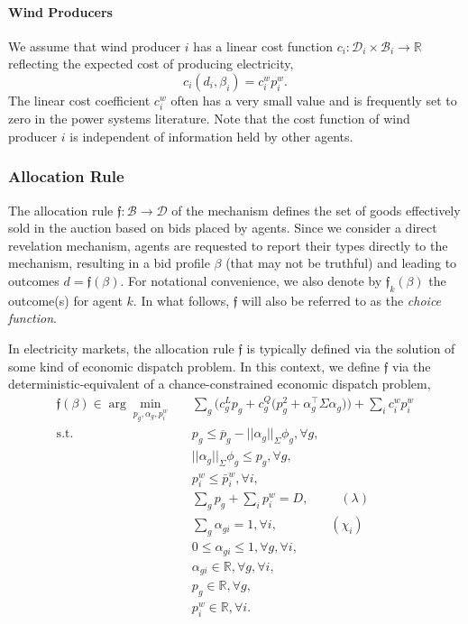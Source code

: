 \documentclass{article}
\begin{document}
\paragraph{Wind Producers} We assume that wind producer $i$ has a linear cost function $c_i: \mathcal{D}_i \times \mathcal{B}_i \rightarrow \mathbb{R}$ reflecting the expected cost of producing electricity,
\begin{equation*}
c_i(d_i, \beta_i) = c_i^w p_i^w.
\end{equation*}
The linear cost coefficient $c_i^w$ often has a very small value and is frequently set to zero in the power systems literature. Note that the cost function of wind producer $i$ is independent of information held by other agents.

\subsubsection{Allocation Rule}

The allocation rule $\mathfrak{f}: \mathcal{B} \rightarrow \mathcal{D}$ of the mechanism defines the set of goods effectively sold in the auction based on bids placed by agents. Since we consider a direct revelation mechanism, agents are requested to report their types directly to the mechanism, resulting in a bid profile $\beta$ (that may not be truthful) and leading to outcomes $d = \mathfrak{f}(\beta)$. For notational convenience, we also denote by $\mathfrak{f}_k(\beta)$ the outcome(s) for agent $k$. In what follows, $\mathfrak{f}$ will also be referred to as the \textit{choice function}.

In electricity markets, the allocation rule $\mathfrak{f}$ is typically defined via the solution of some kind of economic dispatch problem. In this context, we define $\mathfrak{f}$ via the deterministic-equivalent of a chance-constrained economic dispatch problem,
\begin{align}
\mathfrak{f}(\beta) \in \arg \underset{p_g, \alpha_g,p_i^w}{\min} \hspace{10pt} & \sum_g \Big(c_g^L p_g + c_g^Q \big(p_g^2 + \alpha_g^\top \Sigma \alpha_g\big)\Big) + \sum_i c_i^w p_i^w \\
\mbox{s.t. } & p_g \le \overline{p}_g - ||\alpha_g||_{\Sigma} \phi_g,\forall g,\\
& ||\alpha_g||_{\Sigma} \phi_g \le p_g,\forall g,\\
& p_i^w \le \bar{p}_i^w, \forall i,\\
& \sum_g p_g + \sum_i p_i^w = D, \hspace{30pt} (\lambda)\\
& \sum_g \alpha_{gi} = 1, \forall i, \hspace{50pt} (\chi_i)\\
& 0 \le \alpha_{gi} \le 1, \forall g, \forall i,\\
& \alpha_{gi} \in \mathbb{R}, \forall g, \forall i,\\
& p_g \in \mathbb{R}, \forall g,\\
& p_i^w \in \mathbb{R}, \forall i.
\end{align}
\end{document}
